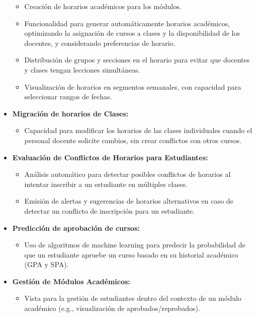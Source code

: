 \begin{itemize}
    \begin{itemize}
	\item Creación de horarios académicos para los módulos.
	\item Funcionalidad para generar automáticamente horarios académicos, optimizando la asignación de cursos a clases y la disponibilidad de los docentes, y considerando preferencias de horario.
	\item Distribución de grupos y secciones en el horario para evitar que docentes y clases tengan lecciones simultáneas.
	\item Visualización de horarios en segmentos semanales, con capacidad para seleccionar rangos de fechas.
    \end{itemize}
\item \textbf{Migración de horarios de Clases:}
    \begin{itemize}
	\item Capacidad para modificar los horarios de las clases individuales cuando el personal docente solicite cambios, sin crear conflictos con otros cursos.
    \end{itemize}
\item \textbf{Evaluación de Conflictos de Horarios para Estudiantes:}
    \begin{itemize}
	\item Análisis automático para detectar posibles conflictos de horarios al intentar inscribir a un estudiante en múltiples clases.
	\item Emisión de alertas y sugerencias de horarios alternativos en caso de detectar un conflicto de inscripción para un estudiante.
    \end{itemize}
\item \textbf{Predicción de aprobación de cursos:}
    \begin{itemize}
	\item Uso de algoritmos de machine learning para predecir la probabilidad de que un estudiante apruebe un curso basado en su historial académico (GPA y SPA).
    \end{itemize}
\item \textbf{Gestión de Módulos Académicos:}
    \begin{itemize}
	\item Vista para la gestión de estudiantes dentro del contexto de un módulo académico (e.g., visualización de aprobados/reprobados).
	\end{itemize}
    \end{itemize}

